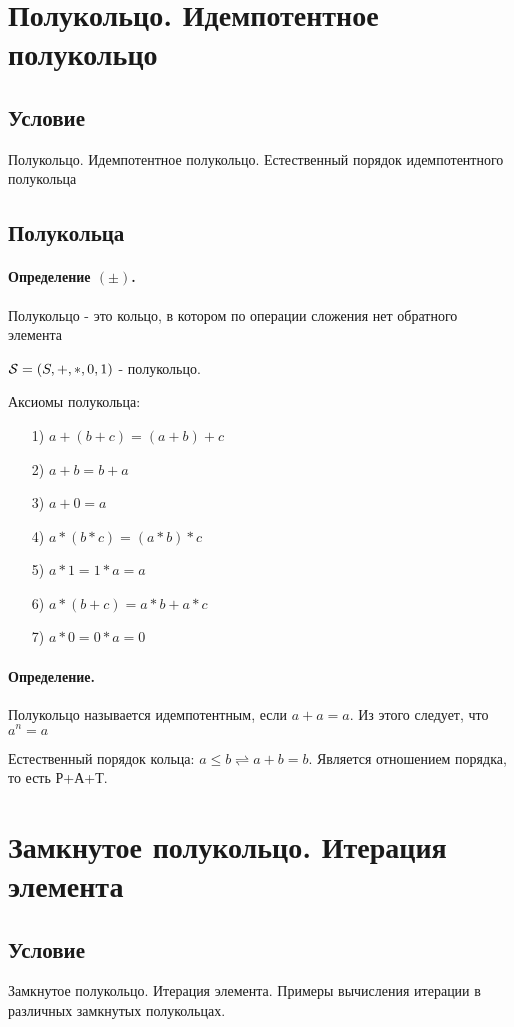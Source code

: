 \documentclass{report}
\begin{document}
\newpage

\section{Полукольцо. Идемпотентное полукольцо}
\subsection{Условие}
Полукольцо. Идемпотентное полукольцо. Естественный порядок идемпотентного
полукольца

\subsection{Полукольца}
\paragraph*{Определение $(\pm)$.} Полукольцо - это кольцо,
в котором по операции сложения нет обратного элемента

${\cal S} = (S, +, *, 0, 1)$ - полукольцо.

\medskip

Аксиомы полукольца:
\begin{itemize}
	\item[1)] $a + (b + c) = (a + b) + c$
	\item[2)] $a + b = b + a$
	\item[3)] $a + 0 = a$
	\item[4)] $a*(b*c) = (a*b)*c$
	\item[5)] $a*1=1*a=a$
	\item[6)] $a*(b+c)=a*b+a*c$
	\item[7)] $a*0 = 0*a=0$
\end{itemize}

\paragraph*{Определение.}
Полукольцо называется идемпотентным, если $a + a = a$. Из этого следует, что $a^n = a$

Естественный порядок кольца: $a \leq b \rightleftharpoons a + b = b$. Является отношением порядка, то есть Р+А+Т.


\newpage

\section{Замкнутое полукольцо. Итерация элемента}
\subsection{Условие}
Замкнутое полукольцо. Итерация элемента. Примеры вычисления итерации в
различных замкнутых полукольцах.
\end{document}
